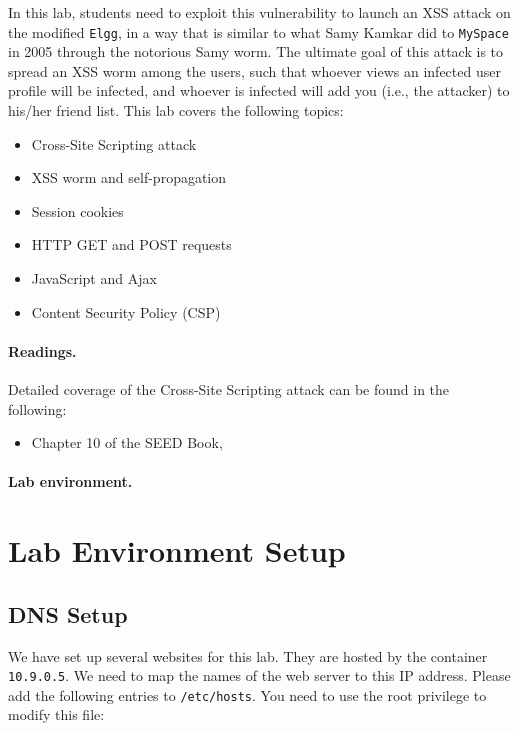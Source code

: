 In this lab, students need to exploit this vulnerability to 
launch an XSS attack on the modified {\tt Elgg}, in a way that is 
similar to what Samy Kamkar
did to {\tt MySpace} in 2005 through the notorious Samy worm. 
The ultimate goal of this attack is to spread an XSS worm among the users,
such that whoever views an infected user profile will be infected,
and whoever is infected will add you (i.e., the attacker) to 
his/her friend list. This lab covers the following topics:

\begin{itemize}[noitemsep]
 \item Cross-Site Scripting attack
 \item XSS worm and self-propagation 
 \item Session cookies
 \item HTTP GET and POST requests
 \item JavaScript and Ajax
 \item Content Security Policy (CSP) 
\end{itemize}


\paragraph{Readings.}
Detailed coverage of the Cross-Site Scripting attack can be found in the following:

\begin{itemize}
\item Chapter 10 of the SEED Book, \seedbook
\end{itemize}


\paragraph{Lab environment.} 
\seedenvironmentB  
\nodependency


\section{Lab Environment Setup}


\subsection{DNS Setup} 

We have set up several websites for this lab. They are hosted 
by the container \texttt{10.9.0.5}. We need to map 
the names of the web server to this IP address. 
Please add the following entries to \texttt{/etc/hosts}.
You need to use the root privilege to modify this file:

